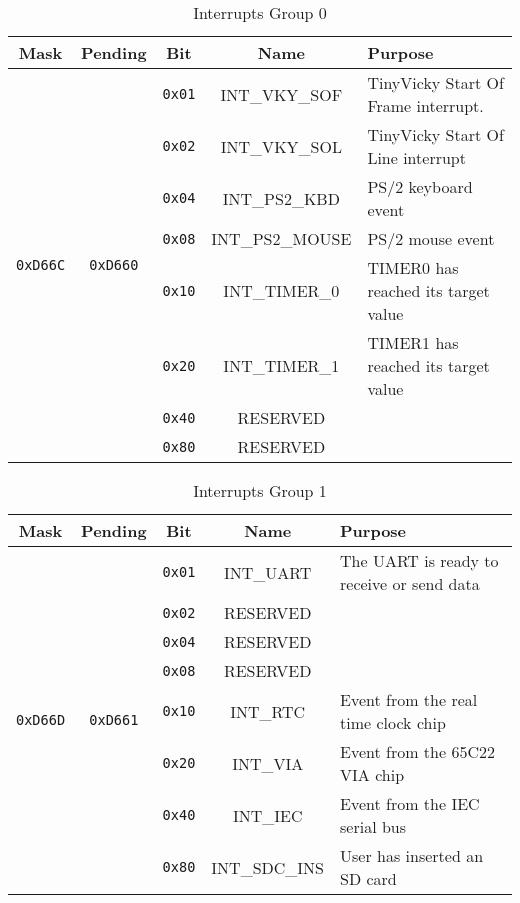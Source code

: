\begin{table}[ht]
	\begin{center}
		\begin{tabular}{| c | c | c | c | l |} \hline
            Mask & Pending & Bit & Name & Purpose \\ \hline\hline
            \multirow{8}{*}{{\tt 0xD66C}} & \multirow{8}{*}{{\tt 0xD660}} & \verb+0x01+ & INT\_VKY\_SOF & TinyVicky Start Of Frame interrupt. \\ \cline{3-5}
            & & \verb+0x02+ & INT\_VKY\_SOL & TinyVicky Start Of Line interrupt \\ \cline{3-5}
            & & \verb+0x04+ & INT\_PS2\_KBD & PS/2 keyboard event \\ \cline{3-5}
            & & \verb+0x08+ & INT\_PS2\_MOUSE & PS/2 mouse event \\ \cline{3-5}
            & & \verb+0x10+ & INT\_TIMER\_0 & TIMER0 has reached its target value \\ \cline{3-5}
            & & \verb+0x20+ & INT\_TIMER\_1 & TIMER1 has reached its target value \\ \cline{3-5}
            & & \verb+0x40+ & RESERVED & \\ \cline{3-5}
            & & \verb+0x80+ & RESERVED & \\ \hline
        \end{tabular}
    \end{center}
	\caption{Interrupts Group 0}
	\label{tab:interrupts}
\end{table}

\begin{table}[ht]
	\begin{center}
		\begin{tabular}{| c | c | c | c | l |} \hline
            Mask & Pending & Bit & Name & Purpose \\ \hline\hline
            \multirow{8}{*}{{\tt 0xD66D}} & \multirow{8}{*}{{\tt 0xD661}} & \verb+0x01+ & INT\_UART & The UART is ready to receive or send data \\ \cline{3-5}
            & & \verb+0x02+ & RESERVED & \\ \cline{3-5}
            & & \verb+0x04+ & RESERVED & \\ \cline{3-5}
            & & \verb+0x08+ & RESERVED & \\ \cline{3-5}
            & & \verb+0x10+ & INT\_RTC & Event from the real time clock chip \\ \cline{3-5}
            & & \verb+0x20+ & INT\_VIA & Event from the 65C22 VIA chip \\ \cline{3-5}
            & & \verb+0x40+ & INT\_IEC & Event from the IEC serial bus \\ \cline{3-5}
            & & \verb+0x80+ & INT\_SDC\_INS & User has inserted an SD card \\ \hline
        \end{tabular}
    \end{center}
	\caption{Interrupts Group 1}
	\label{tab:interrupts_1}
\end{table}

